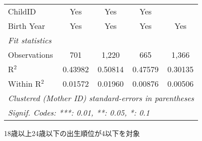 \documentclass{article}
\begin{document}
\begin{landscape}
\begin{threeparttable}[b]
\begin{tabular}{lcccc}
      ChildID                                       & Yes     & Yes     & Yes     & \\  
      Birth Year                                    & Yes     & Yes     & Yes     & Yes\\  
      \midrule
      \emph{Fit statistics}\\
      Observations                                  & 701     & 1,220   & 665     & 1,366\\  
      R$^2$                                         & 0.43982 & 0.50814 & 0.47579 & 0.30135\\  
      Within R$^2$                                  & 0.01572 & 0.01960 & 0.00876 & 0.00506\\  
      \midrule \midrule
      \multicolumn{5}{l}{\emph{Clustered (Mother ID) standard-errors in parentheses}}\\
      \multicolumn{5}{l}{\emph{Signif. Codes: ***: 0.01, **: 0.05, *: 0.1}}\\
   \end{tabular}
   
   \begin{tablenotes}\item 18歳以上24歳以下の出生順位が4以下を対象
   \end{tablenotes}
\end{threeparttable}
\par\endgroup


\end{landscape}
\end{document}
